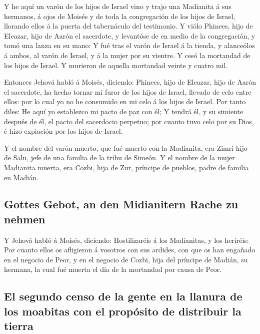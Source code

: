  Y he aquí un varón de los hijos de Israel vino y trajo
una Madianita á sus hermanos, á ojos de Moisés y de toda la congregación
de los hijos de Israel, llorando ellos á la puerta del tabernáculo del
testimonio.  Y viólo Phinees, hijo de Eleazar, hijo de
Aarón el sacerdote, y levantóse de en medio de la congregación, y tomó
una lanza en su mano:  Y fué tras el varón de Israel á la
tienda, y alanceólos á ambos, al varón de Israel, y á la mujer por su
vientre. Y cesó la mortandad de los hijos de Israel.  Y
murieron de aquella mortandad veinte y cuatro mil.

 Entonces Jehová habló á Moisés, diciendo:
 Phinees, hijo de Eleazar, hijo de Aarón el sacerdote, ha
hecho tornar mi furor de los hijos de Israel, llevado de celo entre
ellos: por lo cual yo no he consumido en mi celo á los hijos de Israel.
 Por tanto diles: He aquí yo establezco mi pacto de paz
con él;  Y tendrá él, y su simiente después de él, el
pacto del sacerdocio perpetuo; por cuanto tuvo celo por su Dios, é hizo
expiación por los hijos de Israel.

 Y el nombre del varón muerto, que fué muerto con la
Madianita, era Zimri hijo de Salu, jefe de una familia de la tribu de
Simeón.  Y el nombre de la mujer Madianita muerta, era
Cozbi, hija de Zur, príncipe de pueblos, padre de familia en Madián.

\hypertarget{gottes-gebot-an-den-midianitern-rache-zu-nehmen}{%
\subsection{Gottes Gebot, an den Midianitern Rache zu
nehmen}\label{gottes-gebot-an-den-midianitern-rache-zu-nehmen}}

 Y Jehová habló á Moisés, diciendo: 
Hostilizaréis á los Madianitas, y los heriréis:  Por
cuanto ellos os afligieron á vosotros con sus ardides, con que os han
engañado en el negocio de Peor, y en el negocio de Cozbi, hija del
príncipe de Madián, su hermana, la cual fué muerta el día de la
mortandad por causa de Peor.

\hypertarget{el-segundo-censo-de-la-gente-en-la-llanura-de-los-moabitas-con-el-propuxf3sito-de-distribuir-la-tierra}{%
\subsection{El segundo censo de la gente en la llanura de los moabitas
con el propósito de distribuir la
tierra}\label{el-segundo-censo-de-la-gente-en-la-llanura-de-los-moabitas-con-el-propuxf3sito-de-distribuir-la-tierra}}

